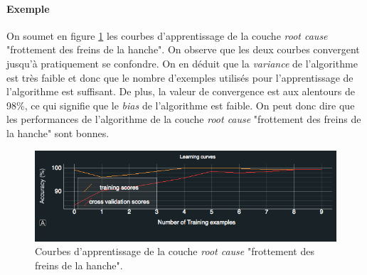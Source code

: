 \paragraph{Exemple}
On soumet en figure \ref{fig:Courbes d'apprentissage} les courbes d'apprentissage de la couche \emph{root cause} "frottement des freins de la hanche". On observe que les deux courbes convergent jusqu'à pratiquement se confondre. On en déduit que la \emph{variance} de l'algorithme est très faible et donc que le nombre d'exemples utilisés pour l'apprentissage de l'algorithme est suffisant. De plus, la valeur de convergence est aux alentours de 98\%, ce qui signifie que le \emph{bias} de l'algorithme est faible. On peut donc dire que les performances de l'algorithme de la couche \emph{root cause} "frottement des freins de la hanche" sont bonnes. 

\begin{figure}[h]
\centering\includegraphics[width=15cm]{images/courbe_apprentissage.png}
\caption[Courbes d'apprentissage]{Courbes d'apprentissage de la couche \emph{root cause} "frottement des freins de la hanche".}
\label{fig:Courbes d'apprentissage}
\end{figure}